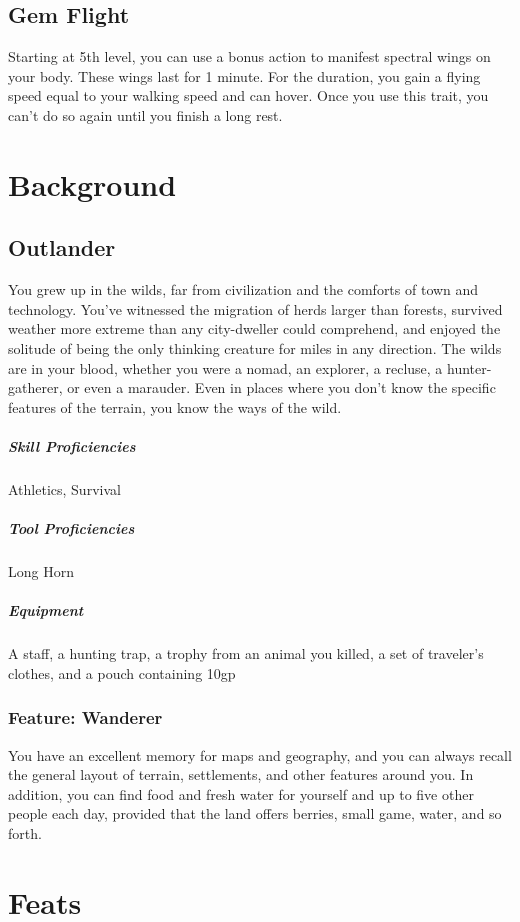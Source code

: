 \documentclass[letterpaper,openany,oneside,twocolumn]{book}
\begin{document}
\subsection*{Gem Flight}
Starting at 5th level, you can use a bonus action to manifest spectral wings on your body. These wings last for 1 minute. For the duration, you gain a flying speed equal to your walking speed and can hover. Once you use this trait, you can't do so again until you finish a long rest.

\section*{Background}
\subsection*{Outlander}
You grew up in the wilds, far from civilization and the comforts of town and technology. You've witnessed the migration of herds larger than forests, survived weather more extreme than any city-dweller could comprehend, and enjoyed the solitude of being the only thinking creature for miles in any direction. The wilds are in your blood, whether you were a nomad, an explorer, a recluse, a hunter-gatherer, or even a marauder. Even in places where you don't know the specific features of the terrain, you know the ways of the wild.
\subparagraph*{Skill Proficiencies}
Athletics, Survival
\subparagraph*{Tool Proficiencies}
Long Horn
\subparagraph*{Equipment}
A staff, a hunting trap, a trophy from an animal you killed, a set of traveler's clothes, and a pouch containing 10gp
\subsubsection*{Feature: Wanderer}
You have an excellent memory for maps and geography, and you can always recall the general layout of terrain, settlements, and other features around you. In addition, you can find food and fresh water for yourself and up to five other people each day, provided that the land offers berries, small game, water, and so forth.

\section*{Feats}
\end{document}
